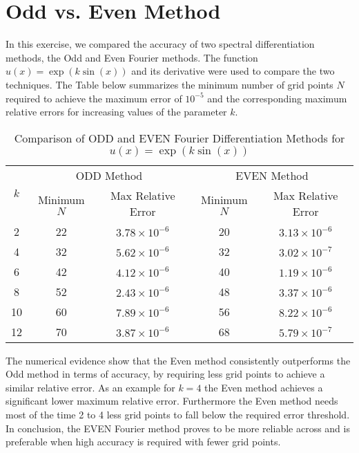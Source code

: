 \section{Odd vs. Even Method}
In this exercise, we compared the accuracy of two spectral differentiation methods, the Odd and Even Fourier methods. The function $u(x)= \exp(k \sin(x))$ and its derivative were used to compare the two techniques. The Table below summarizes the minimum number of grid points $N$ required to achieve the maximum error of $10^{-5}$ and the corresponding maximum relative errors for increasing values of the parameter $k$.
\begin{table}[H]
	\centering
	\begin{tabular}{|c|cc|cc|}
		\hline
		\multirow{2}{*}{$k$} & \multicolumn{2}{c|}{ODD Method} & \multicolumn{2}{c|}{EVEN Method}                                       \\
		\cline{2-5}
		                     & Minimum $N$                     & Max Relative Error               & Minimum $N$ & Max Relative Error    \\
		\hline
		2                    & 22                              & $3.78 \times 10^{-6}$            & 20          & $3.13 \times 10^{-6}$ \\
		4                    & 32                              & $5.62 \times 10^{-6}$            & 32          & $3.02 \times 10^{-7}$ \\
		6                    & 42                              & $4.12 \times 10^{-6}$            & 40          & $1.19 \times 10^{-6}$ \\
		8                    & 52                              & $2.43 \times 10^{-6}$            & 48          & $3.37 \times 10^{-6}$ \\
		10                   & 60                              & $7.89 \times 10^{-6}$            & 56          & $8.22 \times 10^{-6}$ \\
		12                   & 70                              & $3.87 \times 10^{-6}$            & 68          & $5.79 \times 10^{-7}$ \\
		\hline
	\end{tabular}
	\caption{Comparison of ODD and EVEN Fourier Differentiation Methods for $u(x) = \exp(k\sin(x))$}
	\label{tab:fourier-comparison}
\end{table}
The numerical evidence show that the Even method consistently outperforms the Odd method in terms of accuracy, by requiring less grid points to achieve a similar relative error. As an example for $k=4$ the Even method achieves a significant lower maximum relative error. Furthermore the Even method needs most of the time 2 to 4  less grid points to fall below the required error threshold.\\
In conclusion, the EVEN Fourier method proves to be more reliable across and is preferable when high accuracy is required with fewer grid points.
